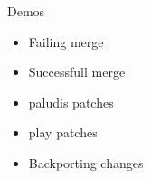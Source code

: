 \documentclass{beamer}
\begin{document}
\begin{frame}{Demos}
    \begin{itemize}
        \item Failing merge
        \pause
        \item Successfull merge
        \pause
        \item paludis patches
        \pause
        \item play patches
        \pause
        \item Backporting changes
    \end{itemize}
\end{frame}
\end{document}
